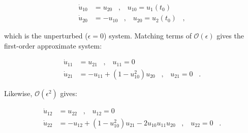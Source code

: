 \documentclass[11pt]{article}
\begin{document}
\begin{equation}
        \label{eq:zeroorder_vdp}
        \begin{aligned}
                \dot{u}_{10} &= u_{20} \;\;\; , \;\;\; u_{10} = u_1(t_0) \\
                \dot{u}_{20} &= -u_{10} \;\;\; , \;\;\; u_{20} = u_2(t_0) \;\;\; ,
        \end{aligned}
\end{equation}

\noindent which is the unperturbed ($\epsilon=0$) system.
Matching terms of $\mathcal{O}(\epsilon)$ gives the first-order approximate system:

\begin{equation}
        \label{eq:firstorder_vdp}
        \begin{aligned}
                \dot{u}_{11} &= u_{21} \;\;\; , \;\;\; u_{11} = 0 \\
                \dot{u}_{21} &= -u_{11} + ( 1 - u_{10}^2 ) u_{20} \;\;\; , \;\;\; u_{21} = 0 \;\;\; .
        \end{aligned}
\end{equation}

\noindent Likewise, $\mathcal{O}(\epsilon^2)$ gives:

\begin{equation}
        \label{eq:secondorder_vdp}
        \begin{aligned}
                \dot{u}_{12} &= u_{22} \;\;\; , \;\;\; u_{12} = 0 \\
                \dot{u}_{22} &= -u_{12} + ( 1 - u_{10}^2 ) u_{21} - 2 u_{10} u_{11} u_{20} \;\;\; , \;\;\; u_{22} = 0 \;\;\; .
        \end{aligned}
\end{equation}




\section*{}
\newpage


\end{document}
